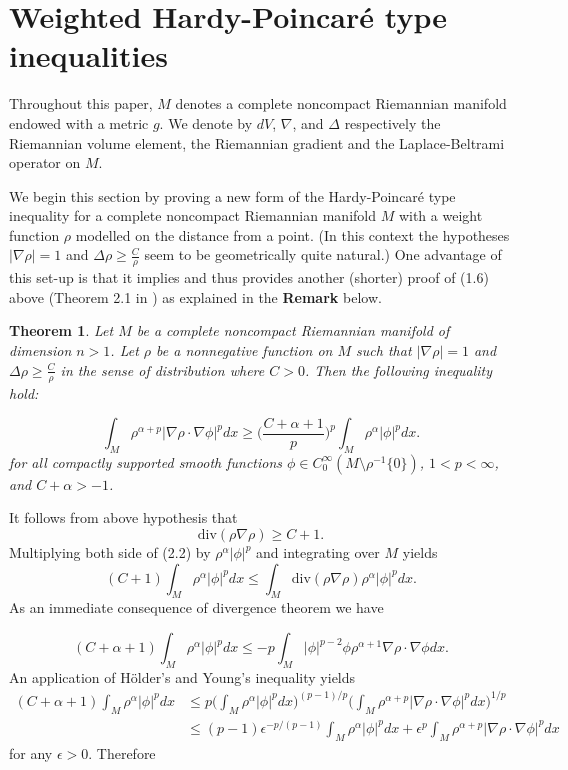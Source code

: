\documentclass[12pt]{amsart}
\numberwithin{equation}{section}
\newtheorem{theorem}{Theorem}
\numberwithin{theorem}{section}
\numberwithin{theorem}{section} \numberwithin{lemma}{section}
\numberwithin{definition}{section}
\numberwithin{corollary}{section}
\numberwithin{remark}{section}
\numberwithin{proposition}{section}
\begin{document}
\section{Weighted Hardy-Poincar\'e type inequalities}

Throughout this paper, $M$ denotes a complete noncompact Riemannian manifold  endowed with a metric $g$. We denote by $dV$, $\nabla$, and $\Delta$ respectively the Riemannian volume element, the Riemannian gradient and the Laplace-Beltrami operator on $M$.

We begin this section by proving a new form of the Hardy-Poincar\'e
type inequality for a complete noncompact Riemannian manifold $M$
with a weight function $\rho$ modelled on the distance from a point.
(In this context the hypotheses $|\nabla \rho|=1$ and $\Delta\rho\ge
\frac{C}{\rho}$ seem to be geometrically quite natural.) One
advantage of this set-up is that it implies and thus provides
another (shorter) proof of (1.6) above (Theorem 2.1 in
\cite{Kombe-Ozaydin}) as explained in the \textbf{Remark} below.

\begin{theorem} Let $M$ be a complete noncompact Riemannian manifold of dimension
$n>1$. Let $\rho$ be a nonnegative function on $M$ such that
$|\nabla\rho|=1$ and $\Delta\rho\ge \frac{C}{\rho}$ in the sense of
distribution where $ C>0$. Then the following inequality hold:

\begin{equation}\int_{M} \rho^{\alpha+p}|\nabla \rho\cdot \nabla\phi|^pdx
\ge \Big(\frac{C+\alpha+1}{p}\Big)^p \int_{M}
\rho^{\alpha}|\phi|^pdx.\end{equation} for all compactly supported
smooth functions $\phi\in C_0^{\infty}(M\setminus
\rho^{-1}\{0\})$, $1<p<\infty$, and $C+\alpha>-1$.
\end{theorem}
\proof

It follows from above hypothesis that \begin{equation}
\text{div}(\rho\nabla \rho)\ge C+1.\end{equation} Multiplying both
side
 of (2.2) by $\rho^{\alpha}|\phi|^p$ and integrating over $M$ yields
\[(C+1)\int_M \rho^{\alpha}|\phi|^p dx\le \int_M \text{div}(\rho\nabla
\rho)\rho^{\alpha}|\phi|^pdx.\] As an immediate consequence of
divergence theorem we have

\[(C+\alpha+1)\int_M\rho^{\alpha}|\phi|^pdx \le -p\int_M |\phi|^{p-2}\phi \rho^{\alpha+1}
\nabla \rho\cdot\nabla \phi dx.\] An application of H\"older's and
Young's inequality yields
\[\begin{aligned}(C+\alpha+1)\int_M \rho^{\alpha}|\phi|^pdx &\le p
\Big(\int_M \rho^{\alpha}|\phi|^pdx\Big)^{(p-1)/p}\Big(\int_M
\rho^{\alpha+p}|\nabla\rho\cdot
\nabla\phi|^p dx\Big)^{1/p}\\
&\le (p-1)\epsilon^{-p/(p-1)}\int_M \rho^{\alpha}|\phi|^pdx+
\epsilon^p \int _M \rho^{\alpha+p}|\nabla \rho\cdot \nabla\phi|^p dx
\end{aligned}\] for any $\epsilon>0$. Therefore
\end{document}
